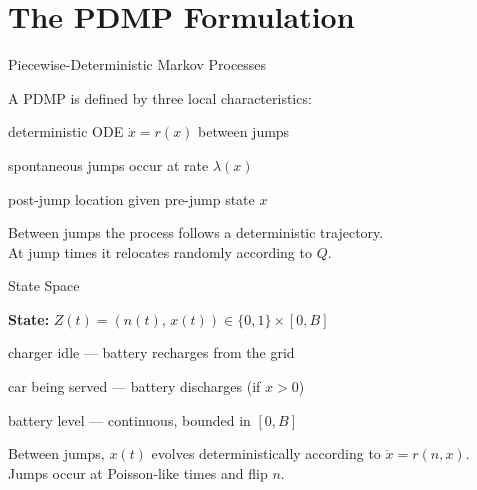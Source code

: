 \documentclass[aspectratio=169]{beamer}
\begin{document}
\section{The PDMP Formulation}

\begin{frame}{Piecewise-Deterministic Markov Processes}

  A PDMP \citep{Davis1984} is defined by three local characteristics:

  \medskip
  \begin{description}
    \setlength\itemsep{0.8em}
    \item[\normalfont Flow $r(x)$:] deterministic ODE $\dot{x} = r(x)$ between jumps
    \item[\normalfont Jump rate $\lambda(x)$:] spontaneous jumps occur at rate $\lambda(x)$
    \item[\normalfont Kernel $Q(\cdot\,;x)$:] post-jump location given pre-jump state $x$
  \end{description}

  \medskip
  \begin{block}{}
    Between jumps the process follows a deterministic trajectory.\\
    At jump times it relocates randomly according to $Q$.
  \end{block}

\end{frame}

\begin{frame}{State Space}

  \textbf{State:} $Z(t) = (n(t),\, x(t)) \in \{0,1\} \times [0,B]$

  \bigskip
  \begin{description}
    \setlength\itemsep{1em}
    \item[$n=0$] charger idle — battery recharges from the grid
    \item[$n=1$] car being served — battery discharges (if $x>0$)
    \item[$x$] battery level — continuous, bounded in $[0,B]$
  \end{description}

  \bigskip
  \begin{block}{}
    Between jumps, $x(t)$ evolves deterministically according to $\dot{x} = r(n,x)$.\\
    Jumps occur at Poisson-like times and flip $n$.
  \end{block}

\end{frame}
\end{document}
